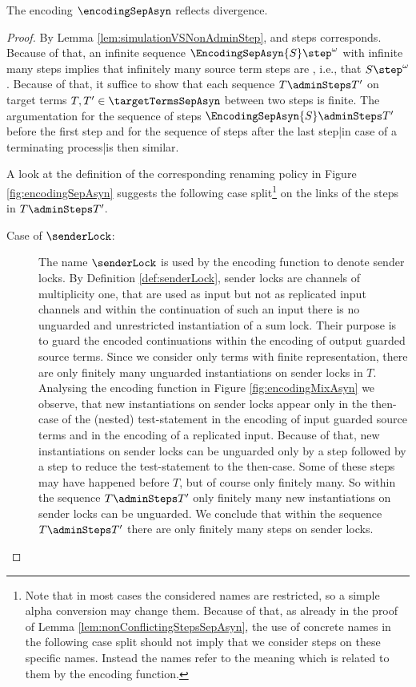 \documentclass[]{llncs}
\begin{document}
\begin{lemma} \label{lem:divergenceReflectionSepAsyn}
	The encoding $ \encodingSepAsyn $ reflects divergence.
\end{lemma}

\begin{proof}
	By Lemma \ref{lem:simulationVSNonAdminStep}, \simulations and \nonAdmin steps corresponds. Because of that, an infinite sequence $ \EncodingSepAsyn{S} \step^{\omega} $ with infinite many \nonAdmin steps implies that infinitely many source term steps are \simulated, i.e., that $ S \step^{\omega} $. Because of that, it suffice to show that each sequence $ T \adminSteps T' $ on target terms $ T, T' \in \targetTermsSepAsyn $ between two \nonAdmin steps is finite. The argumentation for the sequence of \admin steps $ \EncodingSepAsyn{S} \adminSteps T' $ before the first \nonAdmin step and for the sequence of \admin steps after the last \nonAdmin step|in case of a terminating process|is then similar.
	
	A look at the definition of the corresponding renaming policy in Figure \ref{fig:encodingSepAsyn} suggests the following case split\footnote{Note that in most cases the considered names are restricted, so a simple alpha conversion may change them. Because of that, as already in the proof of Lemma \ref{lem:nonConflictingStepsSepAsyn}, the use of concrete names in the following case split should not imply that we consider steps on these specific names. Instead the names refer to the meaning which is related to them by the encoding function.} on the links of the steps in $ T \adminSteps T' $.
	\begin{description}
		\item[Case of $ \senderLock $:] The name $ \senderLock $ is used by the encoding function to denote sender locks. By Definition \ref{def:senderLock}, sender locks are channels of multiplicity one, that are used as input but not as replicated input channels and within the continuation of such an input there is no unguarded and unrestricted instantiation of a sum lock. Their purpose is to guard the encoded continuations within the encoding of output guarded source terms. Since we consider only terms with finite representation, there are only finitely many unguarded instantiations on sender locks in $ T $. Analysing the encoding function in Figure \ref{fig:encodingMixAsyn} we observe, that new instantiations on sender locks appear only in the then-case of the (nested) test-statement in the encoding of input guarded source terms and in the encoding of a replicated input. Because of that, new instantiations on sender locks can be unguarded only by a \nonAdmin step followed by a \pure \admin step to reduce the test-statement to the then-case. Some of these \nonAdmin steps may have happened before $ T $, but of course only finitely many. So within the sequence $ T \adminSteps T' $ only finitely many new instantiations on sender locks can be unguarded. We conclude that within the sequence $ T \adminSteps T' $ there are only finitely many steps on sender locks.
			

\end{description}
\end{proof}
\end{document}
